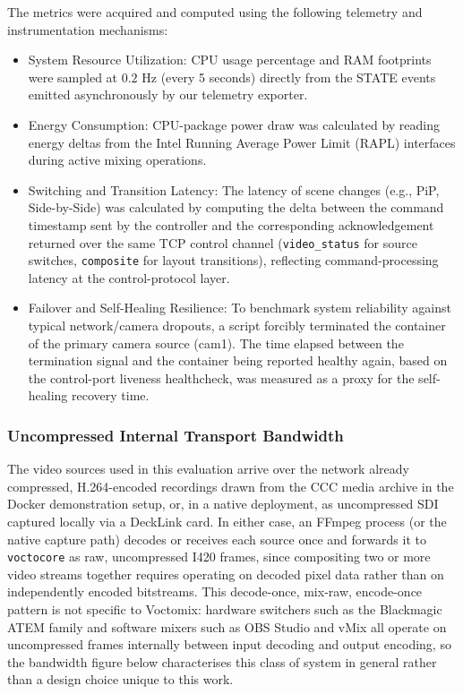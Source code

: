 \documentclass[electronics,article,submit,pdftex,moreauthors]{Definitions/mdpi}
\begin{document}
The metrics were acquired and computed using the following telemetry and instrumentation mechanisms:

\begin{itemize}
    \item System Resource Utilization: CPU usage percentage and RAM footprints were sampled at $0.2\text{ Hz}$ (every 5 seconds) directly from the STATE events emitted asynchronously by our telemetry exporter.
    \item Energy Consumption: CPU-package power draw was calculated by reading energy deltas from the Intel Running Average Power Limit (RAPL) interfaces during active mixing operations.
    \item Switching and Transition Latency: The latency of scene changes (e.g., PiP, Side-by-Side) was calculated by computing the delta between the command timestamp sent by the controller and the corresponding acknowledgement returned over the same TCP control channel (\texttt{video\_status} for source switches, \texttt{composite} for layout transitions), reflecting command-processing latency at the control-protocol layer.
    \item Failover and Self-Healing Resilience: To benchmark system reliability against typical network/camera dropouts, a script forcibly terminated the container of the primary camera source (cam1). The time elapsed between the termination signal and the container being reported healthy again, based on the control-port liveness healthcheck, was measured as a proxy for the self-healing recovery time.
\end{itemize}

\subsubsection{Uncompressed Internal Transport Bandwidth}
\label{sec:results:bandwidth}

The video sources used in this evaluation arrive over the network already compressed, H.264-encoded recordings drawn from the CCC media archive in the Docker demonstration setup, or, in a native deployment, as uncompressed SDI captured locally via a DeckLink card. In either case, an FFmpeg process (or the native capture path) decodes or receives each source once and forwards it to \texttt{voctocore} as raw, uncompressed I420 frames, since compositing two or more video streams together requires operating on decoded pixel data rather than on independently encoded bitstreams. This decode-once, mix-raw, encode-once pattern is not specific to Voctomix: hardware switchers such as the Blackmagic ATEM family and software mixers such as OBS Studio and vMix all operate on uncompressed frames internally between input decoding and output encoding, so the bandwidth figure below characterises this class of system in general rather than a design choice unique to this work.
\end{document}
